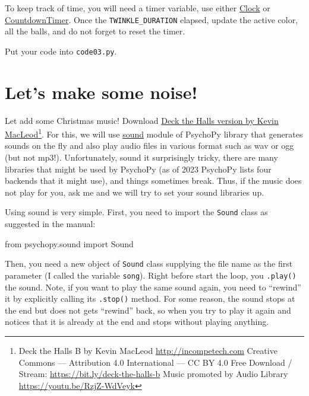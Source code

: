 \documentclass[
]{book}
\newenvironment{Shaded}{\begin{snugshade}}{\end{snugshade}}
\newcommand{\ImportTok}[1]{#1}
\newcommand{\NormalTok}[1]{#1}
\begin{document}
To keep track of time, you will need a timer variable, use either \href{https://psychopy.org/api/clock.html\#psychopy.clock.Clock}{Clock} or \href{https://psychopy.org/api/clock.html\#psychopy.clock.CountdownTimer}{CountdownTimer}. Once the \texttt{TWINKLE\_DURATION} elapsed, update the active color, all the balls, and do not forget to reset the timer.

Put your code into \texttt{code03.py}.

\hypertarget{lets-make-some-noise}{%
\section{Let's make some noise!}\label{lets-make-some-noise}}

Let add some Christmas music! Download \href{material/Deck\%20the\%20Halls\%20B.ogg}{Deck the Halls version by Kevin MacLeod}\footnote{Deck the Halls B by Kevin MacLeod \url{http://incompetech.com}
  Creative Commons --- Attribution 4.0 International --- CC BY 4.0
  Free Download / Stream: \url{https://bit.ly/deck-the-halls-b}
  Music promoted by Audio Library \url{https://youtu.be/RzjZ-WdVeyk}}. For this, we will use \href{https://psychopy.org/api/sound.html}{sound} module of PsychoPy library that generates sounds on the fly and also play audio files in various format such as wav or ogg (but not mp3!). Unfortunately, sound it surprisingly tricky, there are many libraries that might be used by PsychoPy (as of 2023 PsychoPy lists four backends that it might use), and things sometimes break. Thus, if the music does not play for you, ask me and we will try to set your sound libraries up.

Using sound is very simple. First, you need to import the \texttt{Sound} class as suggested in the manual:

\begin{Shaded}
\begin{Highlighting}[]
\ImportTok{from}\NormalTok{ psychopy.sound }\ImportTok{import}\NormalTok{ Sound}
\end{Highlighting}
\end{Shaded}

Then, you need a new object of \texttt{Sound} class supplying the file name as the first parameter (I called the variable \texttt{song}). Right before start the loop, you \texttt{.play()} the sound. Note, if you want to play the same sound again, you need to ``rewind'' it by explicitly calling its \texttt{.stop()} method. For some reason, the sound stops at the end but does not gets ``rewind'' back, so when you try to play it again and notices that it is already at the end and stops without playing anything.
\end{document}
